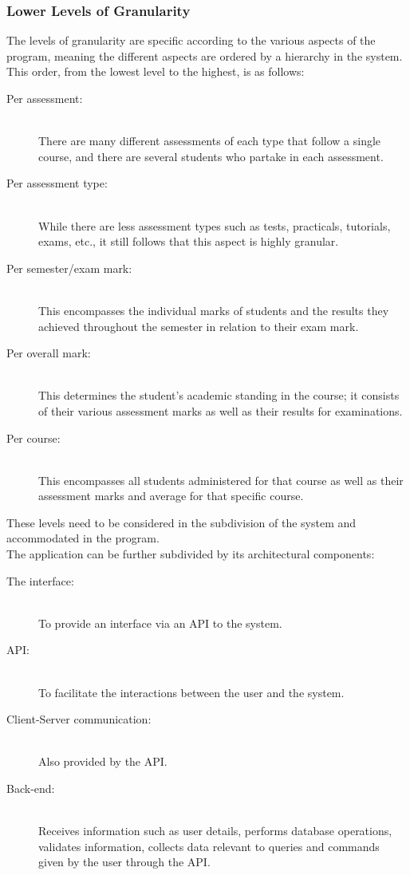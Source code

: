 
\topmargin=-0.45in
\evensidemargin=0in
\oddsidemargin=0in
\textwidth=6.5in
\textheight=9.0in
\headsep=0.25in

\linespread{1.1} %
\subsubsection{Lower Levels of Granularity}
The levels of granularity are specific according to the various aspects of the program,
meaning the different aspects are ordered by a hierarchy in the system.
This order, from the lowest level to the highest, is as follows:
\begin{description}
  \item[Per assessment:] \hfill \\ There are many different assessments of each type that follow a single course,
	 and there are several students who partake in each assessment.
  \item[Per assessment type:] \hfill \\ While there are less assessment types such as tests, practicals, tutorials, 
	 exams, etc., it still follows that this aspect is highly granular.
  \item[Per semester/exam mark:] \hfill \\ This encompasses the individual marks of students and the results they
	 achieved throughout the semester in relation to their exam mark.
  \item[Per overall mark:] \hfill \\ This determines the student's academic standing in the course; it consists of their
	 various assessment marks as well as their results for examinations.
  \item[Per course:] \hfill \\ This encompasses all students administered for that course as well as their assessment 
	 marks and average for that specific course.
\end{description}

These levels need to be considered in the subdivision of the system and accommodated in the program. \\

The application can be further subdivided by its architectural components:

\begin{description}
  \item[The interface:] \hfill \\ To provide an interface via an API to the system.
  \item[API:] \hfill \\ To facilitate the interactions between the user and the system.
  \item[Client-Server communication:] \hfill \\ Also provided by the API.
  \item[Back-end:] \hfill \\ Receives information such as user details, performs database 
	 operations, validates information, collects data relevant to queries 
 	and commands given by the user through the API.
\end{description}

